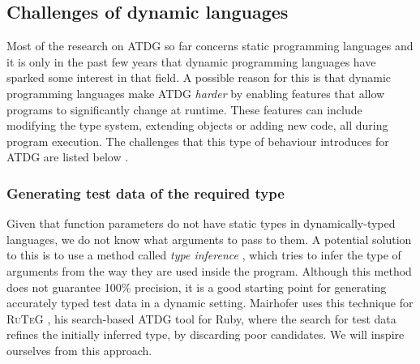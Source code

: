 




\subsection{Challenges of dynamic languages}

Most of the research on ATDG so far concerns static programming languages \cite{mahmood2007systematic} and it is only in the past few years that dynamic programming languages have sparked some interest in that field. A possible reason for this is that dynamic programming languages make ATDG \emph{harder} by enabling features that allow programs to significantly change at runtime. These features can include modifying the type system, extending objects or adding new code, all during program execution. The challenges that this type of behaviour introduces for ATDG are listed below \cite{ducasse2011challenges}.

\subsubsection{Generating test data of the required type}
Given that function parameters do not have static types in dynamically-typed languages, we do not know what arguments to pass to them. A potential solution to this is to use a method called \emph{type inference} \cite{pluquet2009fast}, which tries to infer the type of arguments from the way they are used inside the program. Although this method does not guarantee 100\% precision, it is a good starting point for generating accurately typed test data in a dynamic setting. Mairhofer uses this technique for \textsc{\small RuTeG} \cite{mairhofer2008search}, his search-based ATDG tool for Ruby, where the search for test data refines the initially inferred type, by discarding poor candidates. We will inspire ourselves from this approach.

